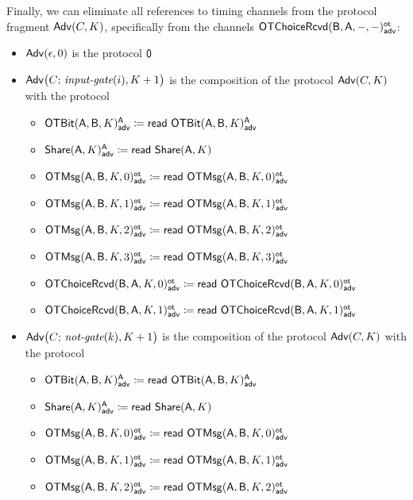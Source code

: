 \noindent Finally, we can eliminate all references to timing channels from the protocol fragment $\Adv(C,K)$, specifically from the channels $\LeakOTChoiceRcvd(\B,\A,-,-)^\ot_\adv$:

\begin{itemize}
\item $\Adv(\epsilon,0)$ is the protocol $\zero$
\item $\Adv\big(C; \, \inputgate(i),K+1\big)$ is the composition of the protocol $\Adv(C,K)$ with the protocol
\begin{itemize}
\item {\color{blue} $\LeakOTBit(\A,\B,K)^\A_\adv \coloneqq \read{\LeakOTBit(\A,\B,K)^\A_\adv}$}
\item {\color{blue} $\LeakShare(\A,K)^\A_\adv \coloneqq \read{\Share(\A,K)}$}\medskip
\item {\color{blue} $\LeakOTMsg(\A,\B,K,0)^\ot_\adv \coloneqq \read{\LeakOTMsg(\A,\B,K,0)^\ot_\adv}$}
\item {\color{blue} $\LeakOTMsg(\A,\B,K,1)^\ot_\adv \coloneqq \read{\LeakOTMsg(\A,\B,K,1)^\ot_\adv}$}
\item {\color{blue} $\LeakOTMsg(\A,\B,K,2)^\ot_\adv \coloneqq \read{\LeakOTMsg(\A,\B,K,2)^\ot_\adv}$}
\item {\color{blue} $\LeakOTMsg(\A,\B,K,3)^\ot_\adv \coloneqq \read{\LeakOTMsg(\A,\B,K,3)^\ot_\adv}$}\medskip
\item {\color{blue} $\LeakOTChoiceRcvd(\B,\A,K,0)^\ot_\adv \coloneqq \read{\LeakOTChoiceRcvd(\B,\A,K,0)^\ot_\adv}$}
\item {\color{blue} $\LeakOTChoiceRcvd(\B,\A,K,1)^\ot_\adv \coloneqq \read{\LeakOTChoiceRcvd(\B,\A,K,1)^\ot_\adv}$}
\end{itemize}
\item $\Adv\big(C; \, \notgate(k),K+1\big)$ is the composition of the protocol $\Adv(C,K)$ with the protocol
\begin{itemize}
\item {\color{blue} $\LeakOTBit(\A,\B,K)^\A_\adv \coloneqq \read{\LeakOTBit(\A,\B,K)^\A_\adv}$}
\item {\color{blue} $\LeakShare(\A,K)^\A_\adv \coloneqq \read{\Share(\A,K)}$}\medskip
\item {\color{blue} $\LeakOTMsg(\A,\B,K,0)^\ot_\adv \coloneqq \read{\LeakOTMsg(\A,\B,K,0)^\ot_\adv}$}
\item {\color{blue} $\LeakOTMsg(\A,\B,K,1)^\ot_\adv \coloneqq \read{\LeakOTMsg(\A,\B,K,1)^\ot_\adv}$}
\item {\color{blue} $\LeakOTMsg(\A,\B,K,2)^\ot_\adv \coloneqq \read{\LeakOTMsg(\A,\B,K,2)^\ot_\adv}$}

\end{itemize}
\end{itemize}
